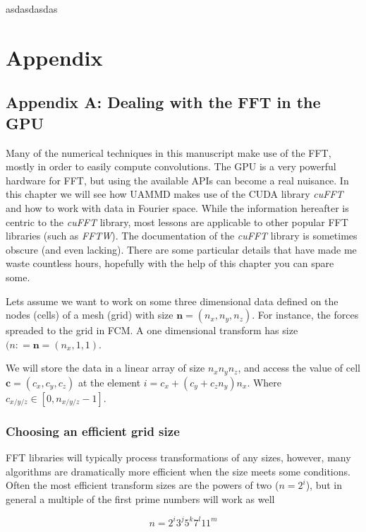 \documentclass[ twoside,openright,titlepage,numbers=noenddot,%
headinclude,footinclude,cleardoublepage=empty,abstract=on,
BCOR=5mm,paper=a4,fontsize=11pt, dvipsnames
]{scrreprt}
\renewcommand{\vec}[1]{\bm{#1}}
\newcommand{\uammd}{\gls{UAMMD}\xspace}
\newcommand{\gpu}{\gls{GPU}\xspace}
\begin{document}
asdasdasdas

\part{Appendix}

\chapter{Appendix A: Dealing with the FFT in the GPU} \label{ch:appendixa}

Many of the numerical techniques in this manuscript make use of the \gls{FFT}, mostly in order to easily compute convolutions. The \gpu is a very powerful hardware for \gls{FFT}, but using the available \glspl{API} can become a real nuisance. In this chapter we will see how \uammd makes use of the CUDA library \emph{cuFFT}\cite{cufft} and how to work with data in Fourier space. While the information hereafter is centric to the \emph{cuFFT} library, most lessons are applicable to other popular \gls{FFT} libraries (such as \emph{FFTW}).
The documentation of the \emph{cuFFT} library is sometimes obscure (and even lacking). There are some particular details that have made me waste countless hours, hopefully with the help of this chapter you can spare some.

Lets assume we want to work on some three dimensional data defined on the nodes (cells) of a mesh (grid) with size $\vec{n} = (n_x, n_y, n_z)$. For instance, the forces spreaded to the grid in \gls{FCM}.
A one dimensional transform has size $(n: = \vec{n} =(n_x,1,1)$.

We will store the data in a linear array of size $n_xn_yn_z$, and access the value of cell $\vec{c} = (c_x,c_y,c_z)$ at the element $i = c_x + (c_y + c_zn_y)n_x$. Where $c_{x/y/z} \in [0, n_{x/y/z}-1]$.

\section*{Choosing an efficient grid size}
\gls{FFT} libraries will typically process transformations of any sizes, however, many algorithms are dramatically more efficient when the size meets some conditions. Often the most efficient transform sizes are the powers of two ($n = 2^i$), but in general a multiple of the first prime numbers will work as well

\begin{equation}
  \label{eq:fftfriendly}
n = 2^i3^j5^k7^l11^m
\end{equation}
\end{document}
